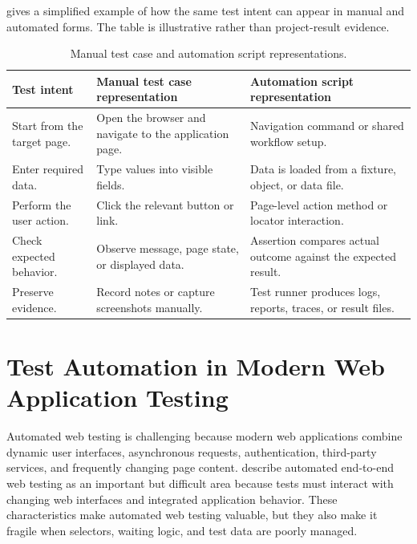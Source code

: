  gives a simplified example of how the same test intent can appear in manual and automated forms. The table is illustrative rather than project-result evidence.

\begin{table}[htbp]
  \centering
  \tablefont
  \begin{tabularx}{\textwidth}{YYY}
    \toprule
    Test intent & Manual test case representation & Automation script representation \\
    \midrule
    Start from the target page. & Open the browser and navigate to the application page. & Navigation command or shared workflow setup. \\
    Enter required data. & Type values into visible fields. & Data is loaded from a fixture, object, or data file. \\
    Perform the user action. & Click the relevant button or link. & Page-level action method or locator interaction. \\
    Check expected behavior. & Observe message, page state, or displayed data. & Assertion compares actual outcome against the expected result. \\
    Preserve evidence. & Record notes or capture screenshots manually. & Test runner produces logs, reports, traces, or result files. \\
    \bottomrule
  \end{tabularx}
  \caption{Manual test case and automation script representations.}
  \label{tab:manual-automation-representations}
\end{table}

\section{Test Automation in Modern Web Application Testing}
\label{sec:ch2-modern-web-automation}

Automated web testing is challenging because modern web applications combine dynamic user interfaces, asynchronous requests, authentication, third-party services, and frequently changing page content. \textcite{leotta_e2e_web_testing_2016} describe automated end-to-end web testing as an important but difficult area because tests must interact with changing web interfaces and integrated application behavior. These characteristics make automated web testing valuable, but they also make it fragile when selectors, waiting logic, and test data are poorly managed.

